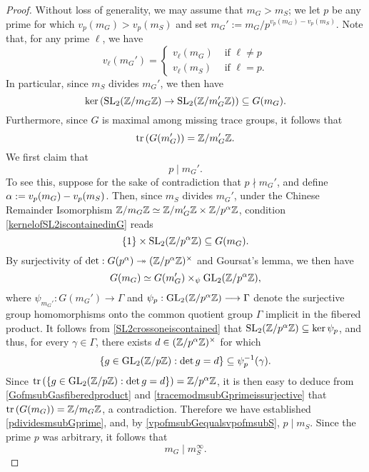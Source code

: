 \begin{proof}
Without loss of generality, we may assume that $m_G > m_S$; we let $p$ be any prime for which $v_p(m_G) > v_p\left( m_S \right)$ and set $m_G' := m_G/p^{v_p(m_G) - v_p(m_S)}$.  Note that, for any prime $\ell$, we have
\begin{equation} \label{vpofmsubGequalsvpofmsubS}
v_{\ell}(m_G') = 
\begin{cases}
v_{\ell}(m_G) & \text{ if } \ell \neq p \\
v_{\ell}(m_S) & \text{ if } \ell = p. 
\end{cases} 
\end{equation}
In particular, since $m_S$ divides $m_G'$, we then have
\begin{equation} \label{kernelofSL2iscontainedinG}
\ker \left( \operatorname{SL}_2(\mathbb{Z}/m_G\mathbb{Z}) \rightarrow \operatorname{SL}_2(\mathbb{Z}/m_G'\mathbb{Z}) \right) \subseteq G(m_G).
\end{equation}
Furthermore, since $G$ is maximal among missing trace groups, it follows that
\begin{equation} \label{tracemodmsubGprimeissurjective}
\operatorname{tr}\left( G(m_G') \right) = \mathbb{Z}/m_G'\mathbb{Z}.
\end{equation}
We first claim that 
\begin{equation} \label{pdividesmsubGprime}
p \mid m_G'.
\end{equation}
To see this, suppose for the sake of contradiction that $p \nmid m_G'$, and define $\alpha := v_p(m_G) - v_p(m_S)$.  Then, since $m_S$ divides $m_G'$, under the Chinese Remainder Isomorphism $\mathbb{Z}/m_G\mathbb{Z} \simeq \mathbb{Z}/m_G'\mathbb{Z} \times \mathbb{Z}/p^{\alpha}\mathbb{Z}$, condition \eqref{kernelofSL2iscontainedinG} reads 
\begin{equation} \label{SL2crossoneiscontained}
\{ 1 \} \times \operatorname{SL}_2(\mathbb{Z}/p^{\alpha}\mathbb{Z}) \subseteq G(m_G).
\end{equation}
By surjectivity of $\det : G(p^{\alpha}) \twoheadrightarrow (\mathbb{Z}/p^{\alpha}\mathbb{Z})^\times$ and Goursat's lemma, we then have
\begin{equation} \label{GofmsubGasfiberedproduct}
G(m_G) \simeq G(m_G') \times_{\psi} \operatorname{GL}_2(\mathbb{Z}/p^{\alpha}\mathbb{Z}),
\end{equation}
where $\psi_{m_G'} : G(m_G') \longrightarrow \Gamma$ and $\psi_p : \operatorname{GL}_2(\mathbb{Z}/p^{\alpha}\mathbb{Z}) \longrightarrow \Gamma$ denote the surjective group homomorphisms onto the common quotient group $\Gamma$ implicit in the fibered product.
It follows from \eqref{SL2crossoneiscontained} that $\operatorname{SL}_2(\mathbb{Z}/p^{\alpha}\mathbb{Z}) \subseteq \ker \psi_p$, and thus, for every $\gamma \in \Gamma$, there exists $d \in (\mathbb{Z}/p^{\alpha}\mathbb{Z})^\times$ for which
\[
\{ g \in \operatorname{GL}_2(\mathbb{Z}/p\mathbb{Z}) : \det g = d \} \subseteq \psi_p^{-1}(\gamma).
\]
Since $\operatorname{tr}\left( \{ g \in \operatorname{GL}_2(\mathbb{Z}/p\mathbb{Z}) : \det g = d \}  \right) = \mathbb{Z}/p^{\alpha}\mathbb{Z}$, it is then easy to deduce from \eqref{GofmsubGasfiberedproduct} and \eqref{tracemodmsubGprimeissurjective} that $\operatorname{tr}\left( G(m_G) \right) = \mathbb{Z}/m_G\mathbb{Z}$, a contradiction.  Therefore we have established \eqref{pdividesmsubGprime}, and, by \eqref{vpofmsubGequalsvpofmsubS}, $p \mid m_S$.  Since the prime $p$ was arbitrary, it follows that
\begin{equation} \label{msubGdividesmsubStotheinfty}
m_G \mid m_S^\infty.
\end{equation}


\end{proof}
